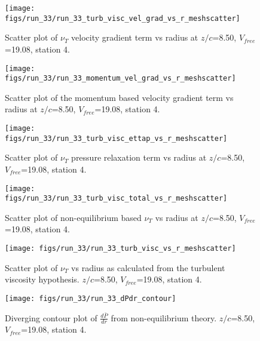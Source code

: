 \begin{figure}[H]
\centering
\texttt{[image: figs/run\_33/run\_33\_turb\_visc\_vel\_grad\_vs\_r\_meshscatter]}
\caption{Scatter plot of $\nu_T$ velocity gradient term vs radius at $z/c$=8.50, $V_{free}$=19.08, station 4.}
\end{figure}


\begin{figure}[H]
\centering
\texttt{[image: figs/run\_33/run\_33\_momentum\_vel\_grad\_vs\_r\_meshscatter]}
\caption{Scatter plot of the momentum based velocity gradient term vs radius at $z/c$=8.50, $V_{free}$=19.08, station 4.}
\end{figure}


\begin{figure}[H]
\centering
\texttt{[image: figs/run\_33/run\_33\_turb\_visc\_ettap\_vs\_r\_meshscatter]}
\caption{Scatter plot of $\nu_T$ pressure relaxation term vs radius at $z/c$=8.50, $V_{free}$=19.08, station 4.}
\end{figure}


\begin{figure}[H]
\centering
\texttt{[image: figs/run\_33/run\_33\_turb\_visc\_total\_vs\_r\_meshscatter]}
\caption{Scatter plot of non-equilibrium based $\nu_T$ vs radius at $z/c$=8.50, $V_{free}$=19.08, station 4.}
\end{figure}


\begin{figure}[H]
\centering
\texttt{[image: figs/run\_33/run\_33\_turb\_visc\_vs\_r\_meshscatter]}
\caption{Scatter plot of $\nu_T$ vs radius as calculated from the turbulent viscosity hypothesis. $z/c$=8.50, $V_{free}$=19.08, station 4.}
\end{figure}


\begin{figure}[H]
\centering
\texttt{[image: figs/run\_33/run\_33\_dPdr\_contour]}
\caption{Diverging contour plot of $\frac{d\bar{P}}{dr}$ from non-equilibrium theory. $z/c$=8.50, $V_{free}$=19.08, station 4.}
\end{figure}


